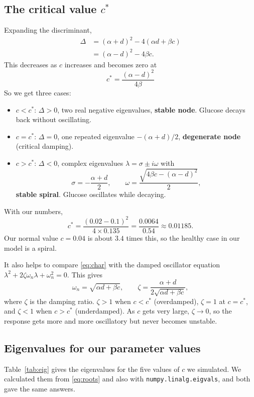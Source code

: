 \documentclass[11pt,a4paper]{article}
\newcommand{\cs}{c^{*}}
\begin{document}
\subsection{The critical value $\cs$}
Expanding the discriminant,
\begin{align}
\Delta &= (\alpha+d)^2 - 4(\alpha d+\beta c) \nonumber\\
       &= (\alpha-d)^2 - 4\beta c. \label{eq:disc}
\end{align}
This decreases as $c$ increases and becomes zero at
\begin{equation}\label{eq:cstar}
\boxed{\;\cs = \frac{(\alpha-d)^2}{4\beta}\;}
\end{equation}
So we get three cases:
\begin{itemize}
\item $c<\cs$: $\Delta>0$, two real negative eigenvalues, \textbf{stable node}. Glucose decays back without oscillating.
\item $c=\cs$: $\Delta=0$, one repeated eigenvalue $-(\alpha+d)/2$, \textbf{degenerate node} (critical damping).
\item $c>\cs$: $\Delta<0$, complex eigenvalues $\lambda=\sigma\pm i\omega$ with
\begin{equation}
\sigma = -\frac{\alpha+d}{2},\qquad \omega=\frac{\sqrt{4\beta c-(\alpha-d)^2}}{2},
\end{equation}
\textbf{stable spiral}. Glucose oscillates while decaying.
\end{itemize}
With our numbers,
\[
\cs = \frac{(0.02-0.1)^2}{4\times0.135} = \frac{0.0064}{0.54} \approx 0.01185 .
\]
Our normal value $c=0.04$ is about $3.4$ times this, so the healthy case in our model is a spiral.

It also helps to compare \eqref{eq:char} with the damped oscillator equation $\lambda^2+2\zeta\omega_n\lambda+\omega_n^2=0$. This gives
\begin{equation}\label{eq:zeta}
\omega_n=\sqrt{\alpha d+\beta c},\qquad
\zeta=\frac{\alpha+d}{2\sqrt{\alpha d+\beta c}} ,
\end{equation}
where $\zeta$ is the damping ratio. $\zeta>1$ when $c<\cs$ (overdamped), $\zeta=1$ at $c=\cs$, and $\zeta<1$ when $c>\cs$ (underdamped). As $c$ gets very large, $\zeta\to0$, so the response gets more and more oscillatory but never becomes unstable.

\subsection{Eigenvalues for our parameter values}
Table~\ref{tab:eig} gives the eigenvalues for the five values of $c$ we simulated. We calculated them from \eqref{eq:roots} and also with \texttt{numpy.linalg.eigvals}, and both gave the same answers.
\end{document}

